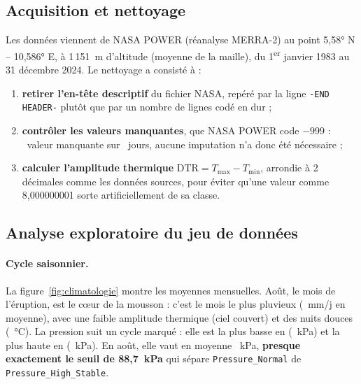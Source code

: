 \documentclass[12pt, a4paper]{article}
\newcommand{\itm}[1]{\texttt{#1}}
\newcommand{\tabin}[1]{\rowcolors{2}{GrisL}{white}}
\begin{document}
\subsection{Acquisition et nettoyage}
\label{sec:nettoyage}

Les données viennent de NASA POWER (réanalyse MERRA-2) au point 5,58° N -- 10,586° E, à
1\,151~m d'altitude (moyenne de la maille), du 1\textsuperscript{er} janvier 1983 au 31
décembre 2024. Le nettoyage a consisté à :
\begin{enumerate}
  \item \textbf{retirer l'en-tête descriptif} du fichier NASA, repéré par la ligne
        \texttt{-END HEADER-} plutôt que par un nombre de lignes codé en dur ;
  \item \textbf{contrôler les valeurs manquantes}, que NASA POWER code $-999$ :
        \Nmanquants~valeur manquante sur \Njours~jours, aucune imputation n'a donc été
        nécessaire ;
  \item \textbf{calculer l'amplitude thermique} $\text{DTR} = T_{\max} - T_{\min}$, arrondie à
        2 décimales comme les données sources, pour éviter qu'une valeur comme 8,000000001
        sorte artificiellement de sa classe.
\end{enumerate}

\begin{table}[H]
\centering
\caption{Variables utilisées et statistiques descriptives (1983--2024).}
\label{tab:descriptives}
\tabin{tab_descriptives}
\end{table}

\subsection{Analyse exploratoire du jeu de données}
\label{sec:eda}

\paragraph{Cycle saisonnier.} La figure~\ref{fig:climatologie} montre les moyennes mensuelles.
Août, le mois de l'éruption, est le cœur de la mousson : c'est le mois le plus pluvieux
(\PluieAout~mm/j en moyenne), avec une faible amplitude thermique (ciel couvert) et des nuits
douces (\TminAout~°C). La pression suit un cycle marqué : elle est la plus basse en
\PSminMois{} (\PSmin~kPa) et la plus haute en \PSmaxMois{} (\PSmax~kPa). En août, elle vaut en
moyenne \PSaout~kPa, \textbf{presque exactement le seuil de 88,7~kPa} qui sépare
\itm{Pressure\_Normal} de \itm{Pressure\_High\_Stable}.
\end{document}
